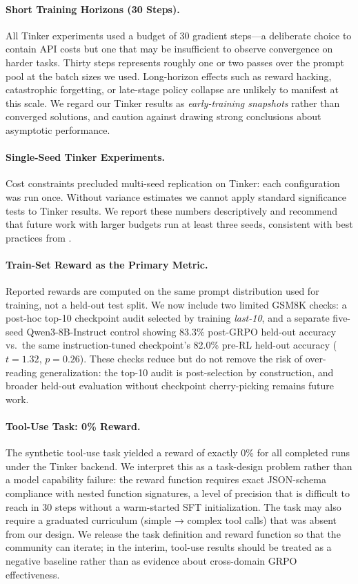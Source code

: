 \documentclass{article}
\begin{document}
\paragraph{Short Training Horizons (30 Steps).}
All Tinker experiments used a budget of 30 gradient steps---a deliberate choice
to contain API costs but one that may be insufficient to observe convergence
on harder tasks. Thirty steps represents roughly one or two passes over the
prompt pool at the batch sizes we used. Long-horizon effects such as reward
hacking, catastrophic forgetting, or late-stage policy collapse are unlikely
to manifest at this scale. We regard our Tinker results as \emph{early-training
snapshots} rather than converged solutions, and caution against drawing strong
conclusions about asymptotic performance.

\paragraph{Single-Seed Tinker Experiments.}
Cost constraints precluded multi-seed replication on Tinker: each configuration
was run once. Without variance estimates we cannot apply standard significance
tests to Tinker results. We report these numbers descriptively and recommend
that future work with larger budgets run at least three seeds, consistent with
best practices from \citet{henderson2018deep}.

\paragraph{Train-Set Reward as the Primary Metric.}
Reported rewards are computed on the same prompt distribution used for
training, not a held-out test split. We now include two limited GSM8K checks:
a post-hoc top-10 checkpoint audit selected by training \emph{last-10}, and a
separate five-seed Qwen3-8B-Instruct control showing 83.3\% post-GRPO
held-out accuracy vs.~the same instruction-tuned checkpoint's 82.0\% pre-RL
held-out accuracy ($t = 1.32$, $p = 0.26$). These checks reduce but do not
remove the risk of over-reading generalization: the top-10 audit is
post-selection by construction, and broader held-out evaluation without
checkpoint cherry-picking remains future work.

\paragraph{Tool-Use Task: 0\% Reward.}
The synthetic tool-use task yielded a reward of exactly 0\% for all completed
runs under the Tinker backend. We interpret this as a task-design problem
rather than a model capability failure: the reward function requires exact
JSON-schema compliance with nested function signatures, a level of precision
that is difficult to reach in 30 steps without a warm-started SFT initialization.
The task may also require a graduated curriculum (simple → complex tool calls)
that was absent from our design. We release the task definition and reward
function so that the community can iterate; in the interim, tool-use results
should be treated as a negative baseline rather than as evidence about
cross-domain GRPO effectiveness.
\end{document}
